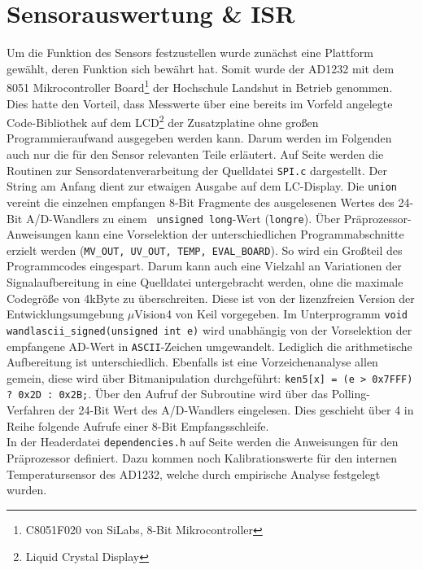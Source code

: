 \documentclass[12pt]{scrreprt} %
\begin{document}
\section{Sensorauswertung \& ISR}
Um die Funktion des Sensors festzustellen wurde zunächst eine Plattform gewählt, deren Funktion sich bewährt hat. Somit wurde der AD1232 mit dem 8051 Mikrocontroller Board\footnote{C8051F020 von SiLabs, 8-Bit Mikrocontroller} der Hochschule Landshut in Betrieb genommen. Dies hatte den Vorteil, dass Messwerte über eine bereits im Vorfeld angelegte Code-Bibliothek auf dem LCD\footnote{Liquid Crystal Display} der Zusatzplatine ohne großen Programmieraufwand ausgegeben werden kann. Darum werden im Folgenden auch nur die für den Sensor relevanten Teile erläutert. Auf Seite \pageref{CC430_SPI} werden die Routinen zur Sensordatenverarbeitung der Quelldatei \texttt{SPI.c} dargestellt. Der String am Anfang dient zur etwaigen Ausgabe auf dem LC-Display. Die \lstinline$union$ vereint die einzelnen empfangen 8-Bit Fragmente des ausgelesenen Wertes des 24-Bit A/D-Wandlers zu einem \lstinline$ unsigned long$-Wert (\lstinline{longre}). Über Präprozessor-Anweisungen kann eine Vorselektion der unterschiedlichen Programmabschnitte erzielt werden (\lstinline$MV_OUT, UV_OUT, TEMP, EVAL_BOARD$). So wird ein Großteil des Programmcodes eingespart. Darum kann auch eine Vielzahl an Variationen der Signalaufbereitung in eine Quelldatei untergebracht werden, ohne die maximale Codegröße von 4kByte zu überschreiten. Diese ist von der lizenzfreien Version der Entwicklungsumgebung $\mu$Vision4 von Keil vorgegeben. Im Unterprogramm \lstinline{void wandlascii_signed(unsigned int e)} wird unabhängig von der Vorselektion der empfangene AD-Wert in \texttt{ASCII}-Zeichen umgewandelt. Lediglich die arithmetische Aufbereitung ist unterschiedlich. Ebenfalls ist eine Vorzeichenanalyse allen gemein, diese wird über Bitmanipulation durchgeführt: \lstinline$ken5[x] = (e > 0x7FFF) ? 0x2D : 0x2B;$. Über den Aufruf der Subroutine wird über das Polling-Verfahren der 24-Bit Wert des A/D-Wandlers eingelesen. Dies geschieht über 4 in Reihe folgende Aufrufe einer 8-Bit Empfangsschleife. \\
In der Headerdatei \texttt{dependencies.h} auf Seite \pageref{CC430_dependencies} werden die Anweisungen für den Präprozessor definiert. Dazu kommen noch Kalibrationswerte für den internen Temperatursensor des AD1232, welche durch empirische Analyse festgelegt wurden.
\end{document}
